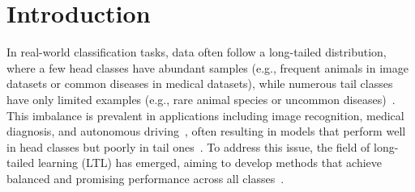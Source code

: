 \vspace{-5mm}
\section{Introduction}
\label{sec:intro}



In real-world classification tasks, data often follow a long-tailed distribution, where a few head classes have abundant samples (e.g., frequent animals in image datasets or common diseases in medical datasets), while numerous tail classes have only limited examples (e.g., rare animal species or uncommon diseases)~\cite{zhang2023deep, zhang2025systematic, johnson2019mimic}. This imbalance is prevalent in applications including image recognition, medical diagnosis, and autonomous driving~\cite{van2018inaturalist, yasunobu2003auto, ao2020application}, often resulting in models that perform well in head classes but poorly in tail ones~\cite{menon2021longtail, li2022long}. To address this issue, the field of long-tailed learning (LTL) has emerged, aiming to develop methods that achieve balanced and promising performance across all classes~\cite{cao2019learning, kang2020decoupling, hou2025learning}.


